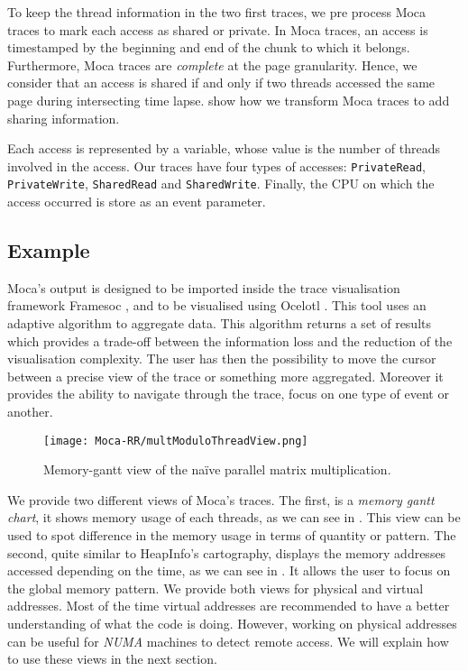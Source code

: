 To keep the thread information in the two first traces, we pre process \gls{Moca} traces to mark each access as shared or private.
In \gls{Moca} traces, an access is timestamped by the beginning and end of the chunk to which it belongs.
Furthermore, \gls{Moca} traces are \emph{complete} at the page granularity.
Hence, we consider that an access is shared if and only if two threads accessed the same page during intersecting time lapse.
 show how we transform \gls{Moca} traces to add sharing information.

Each access is represented by a variable, whose value is the number of threads involved in the access.
Our traces have four types of accesses: \texttt{PrivateRead}, \texttt{PrivateWrite}, \texttt{SharedRead} and \texttt{SharedWrite}.
Finally, the \gls{CPU} on which the access occurred is store as an event parameter.

\subsection{Example}


\gls{Moca}'s output is designed to be imported inside the trace visualisation framework \gls{Framesoc} \cite{Pagano13Trace}, and to be visualised using \gls{Ocelotl} \cite{Dosimont14Trace}.
This tool uses an adaptive algorithm to aggregate data.
This algorithm returns a set of results which provides a trade-off between the information loss and the reduction of the visualisation complexity.
The user has then the possibility to move the cursor between a precise view of the trace or something more aggregated.
Moreover it provides the ability to navigate through the trace, focus on one type of event or another.

\begin{figure}[htb]
    \centering
    \texttt{[image: Moca-RR/multModuloThreadView.png]}
    \caption{Memory-gantt view of the naïve parallel matrix multiplication.}
    \label{fig:ocelotl-th0}
\end{figure}


We provide two different views of \gls{Moca}'s traces.
The first, is a \emph{memory gantt chart}, it shows memory usage of each threads, as we can see in .
This view can be used to spot difference in the memory usage in terms of quantity or pattern.
The second, quite similar to HeapInfo's cartography, displays the memory addresses accessed depending on the time, as we can see in .
It allows the user to focus on the global memory pattern.
We provide both views for physical and virtual addresses.
Most of the time virtual addresses are recommended to have a better understanding of what the code is doing.
However, working on physical addresses can be useful for \emph{NUMA} machines to detect remote access.
We will explain how to use these views in the next section.

